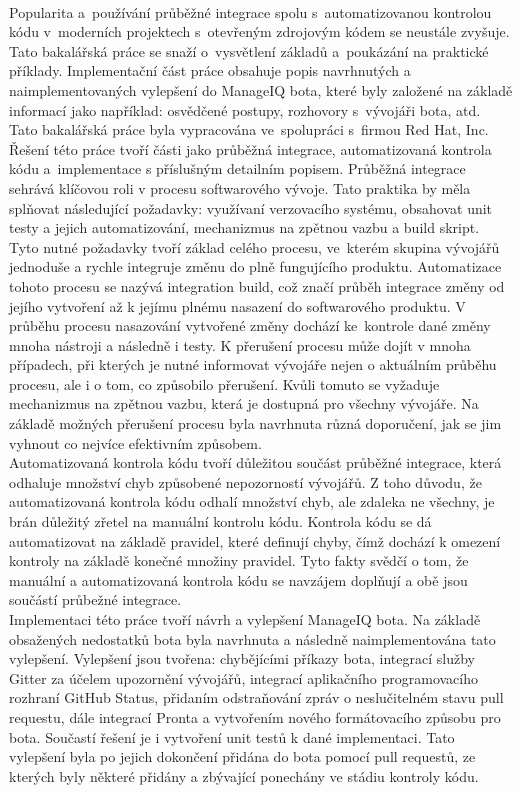\\
Popularita a~používání průběžné integrace spolu s~automatizovanou kontrolou kódu v~mo\-derních projektech s~otevřeným zdrojovým kódem se neustále zvyšuje. Tato bakalářská práce se snaží o~vysvětlení základů a~poukázání na praktické příklady. Implementační část práce obsahuje popis navrhnutých a naimplementovaných vylepšení do ManageIQ bota, které byly založené na základě informací jako například: osvědčené postupy, rozhovory s~vývojáři bota, atd. Tato bakalářská práce byla vypracována ve~spolupráci s~firmou Red Hat, Inc.\\[1em]
\indent Řešení této práce tvoří části jako průběžná integrace, automatizovaná kontrola kódu a~implementace s příslušným detailním popisem. Průběžná integrace sehrává klíčovou roli v procesu softwarového vývoje. Tato praktika by měla splňovat následující požadavky: využívaní verzovacího systému, obsahovat unit testy a jejich automatizování, mechanizmus na zpětnou vazbu a build skript. Tyto nutné požadavky tvoří základ celého procesu, ve~kterém skupina vývojářů jednoduše a rychle integruje změnu do plně fungujícího produktu. Automatizace tohoto procesu se nazývá integration build, což značí průběh integrace změny od jejího vytvoření až k jejímu plnému nasazení do softwarového produktu. V průběhu procesu nasazování vytvořené změny dochází ke~kontrole dané změny mnoha nástroji a následně i testy. K přerušení procesu může dojít v mnoha případech, při kterých je nutné informovat vývojáře nejen o aktuálním průběhu procesu, ale i o tom, co způsobilo přerušení. Kvůli tomuto se vyžaduje mechanizmus na zpětnou vazbu, která je dostupná pro všechny vývojáře. Na základě možných přerušení procesu byla navrhnuta různá doporučení, jak se jim vyhnout co nejvíce efektivním způsobem.\\[1em]
\indent Automatizovaná kontrola kódu tvoří důležitou součást průběžné integrace, která odhaluje množství chyb způsobené nepozorností vývojářů. Z toho důvodu, že automatizovaná kontrola kódu odhalí množství chyb, ale zdaleka ne všechny, je brán důležitý zřetel na manuální kontrolu kódu. Kontrola kódu se dá automatizovat na základě pravidel, které definují chyby, čímž dochází k omezení kontroly na základě konečné množiny pravidel. Tyto fakty svědčí o tom, že manuální a automatizovaná kontrola kódu se navzájem doplňují a obě jsou součástí průbežné integrace.\\[1em]
\indent Implementaci této práce tvoří návrh a vylepšení ManageIQ bota. Na základě obsažených nedostatků bota byla navrhnuta a následně naimplementována tato vylepšení. Vylepšení jsou tvořena: chybějícími příkazy bota, integrací služby Gitter za účelem upozornění vývojářů, integrací aplikačního programovacího rozhraní GitHub Status, přidaním odstraňování zpráv o neslučitelném stavu pull requestu, dále integrací Pronta a vytvořením nového formátovacího způsobu pro bota. Součastí řešení je i vytvoření unit testů k dané implementaci. Tato vylepšení byla po jejich dokončení přidána do bota pomocí pull requestů, ze kterých byly některé přidány a zbývající ponechány ve stádiu kontroly kódu.\\[1em]
